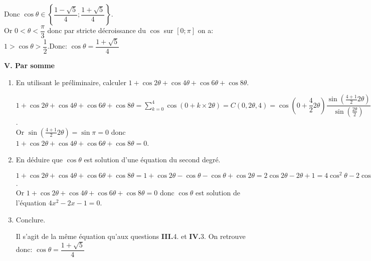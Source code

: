 \documentclass[a4paper,french,bookmarks]{article}
\begin{document}
\begin{enumerate}
\begin{tcolorbox}[colback=black!8,colframe=black!9,boxrule=.25pt,enhanced,arc is angular,arc=0pt]
    Donc $\displaystyle\cos \theta \in \left\lbrace\dfrac{1-\sqrt{5}}{4};\dfrac{1+\sqrt{5}}{4}\right\rbrace$.\\
    Or $0 < \theta < \dfrac{\pi}{3}$ donc par stricte décroissance du $\cos$ sur $\left[0;\pi\right]$ on a: $1 > \cos \theta > \dfrac{1}{2}$.\qquad  Donc:
    $\displaystyle\boxed{\cos \theta = \dfrac{1+\sqrt{5}}{4}}$
    \end{tcolorbox}
\end{enumerate}

\noindent\textbf{V. Par somme}
\begin{enumerate}
    \item En utilisant le préliminaire, calculer $1 + \cos 2\theta + \cos 4\theta + \cos 6\theta + \cos 8\theta$.
     \begin{tcolorbox}[colback=black!8,colframe=black!9,boxrule=.25pt,enhanced,arc is angular,arc=0pt]
     $\displaystyle1 + \cos 2\theta + \cos 4\theta + \cos 6\theta + \cos 8\theta = \sum_{k=0}^4  \cos(0+k\times2\theta) = C(0,2\theta,4)=\cos\left(0+\dfrac{4}{2}2\theta\right)\dfrac{\sin\left(\frac{4+1}{2}2\theta\right)}{\sin\left(\frac{2\theta}{2}\right)}$.\\
     Or $\sin\left(\frac{4+1}{2}2\theta\right)=\sin\pi=0$ donc $\displaystyle1 + \cos 2\theta + \cos 4\theta + \cos 6\theta + \cos 8\theta = 0$. 
     \end{tcolorbox}
    \item En déduire que $\cos \theta$ est solution d'une équation du second degré.
    \begin{tcolorbox}[colback=black!8,colframe=black!9,boxrule=.25pt,enhanced,arc is angular,arc=0pt]
    $1 + \cos 2\theta + \cos 4\theta + \cos 6\theta + \cos 8\theta = 1 + \cos 2\theta - \cos \theta - \cos \theta + \cos 2\theta = 2\cos 2\theta - 2\theta + 1 = 4\cos^2\theta -2\cos \theta - 1$.\\
    Or $\displaystyle1 + \cos 2\theta + \cos 4\theta + \cos 6\theta + \cos 8\theta = 0$ donc $\cos \theta$ est solution de l'équation $4x^2-2x-1=0$.
    \end{tcolorbox}
    \item Conclure.
    \begin{tcolorbox}[colback=black!8,colframe=black!9,boxrule=.25pt,enhanced,arc is angular,arc=0pt]
    Il s'agit de la même équation qu'aux questions \textbf{III.}4. et \textbf{IV.}3. On retrouve donc: \qquad  
    $\displaystyle\boxed{\cos \theta = \dfrac{1+\sqrt{5}}{4}}$
    \end{tcolorbox}
\end{enumerate}
\end{document}
